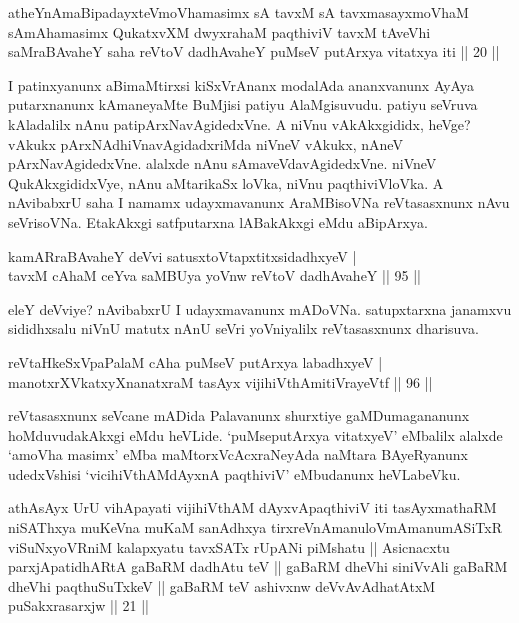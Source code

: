 \begin{shl}
atheYnAmaBipadayxteV\s moV\s hamasimx sA tavxM sA tavxmasayxmoV\s haM sAmAhamasimx QukatxvXM dwyxrahaM paqthiviV tavxM tAveVhi saMraBAvaheY saha reVtoV dadhAvaheY puMseV putArxya vitatxya iti || 20 ||
\end{shl}


\begin{artha}
I patinxyanunx aBimaMtirxsi kiSxVrAnanx modalAda ananxvanunx AyAya 
putarxnanunx kAmaneyaMte BuMjisi patiyu AlaMgisuvudu. patiyu seVruva 
kAladalilx nAnu patipArxNavAgidedxVne. A niVnu vAkAkxgididx, heVge? 
vAkukx pArxNAdhiVnavAgidadxriMda niVneV vAkukx, nAneV 
pArxNavAgidedxVne. alalxde nAnu sAmaveVdavAgidedxVne. niVneV 
QukAkxgididxVye, nAnu aMtarikaSx loVka, niVnu paqthiviVloVka. A 
nAvibabxrU saha I namamx udayxmavanunx AraMBisoVNa reVtasasxnunx nAvu 
seVrisoVNa. EtakAkxgi satfputarxna lABakAkxgi eMdu aBipArxya.
\end{artha}

\begin{shl}
kamAR\s \s raBAvaheY deVvi satusxtoVtapxtitxsidadhxyeV | \\
tavxM cAhaM ceYva saMBUya yoVnw reVtoV dadhAvaheY \hfill|| 95 || 
\end{shl}
	
\begin{artha}
eleY deVviye? nAvibabxrU I udayxmavanunx mADoVNa. satupxtarxna 
janamxvu sididhxsalu niVnU matutx nAnU seVri yoVniyalilx reVtasasxnunx 
dharisuva.
\end{artha}

\begin{shl}
reVtaHkeSxVpaPalaM cA\s \s ha puMseV putArxya labadhxyeV | \\
manotxrXVkatxyXnanatxraM tasAyx vijihiVthAmitiVrayeVtf \hfill|| 96 || 
\end{shl}

\begin{artha}
reVtasasxnunx seVcane mADida Palavanunx shurxtiye gaMDumagananunx 
hoMduvudakAkxgi eMdu heVLide. `puMseputArxya vitatxyeV' eMbalilx 
alalxde `amoV\s ha masimx' eMba maMtorxVcAcxraNeyAda naMtara 
BAyeRyanunx udedxVshisi `vicihiVthAMdAyxnA paqthiviV' eMbudanunx 
heVLabeVku.
\end{artha}

\begin{shl}
athAsAyx UrU vihApayati vijihiVthAM dAyxvApaqthiviV iti tasAyxmathaRM niSAThxya muKeVna muKaM sanAdhxya tirxreVnAmanuloVmAmanumASiTxR viSuNxyoVRniM kalapxyatu tavxSATx rUpANi piMshatu || Asicnacxtu parxjApatidhARtA gaBaRM dadhAtu teV || gaBaRM dheVhi siniVvAli gaBaRM dheVhi paqthuSuTxkeV || gaBaRM teV ashivxnw deVvAvAdhatAtxM puSakxrasarxjw || 21 ||
\end{shl}

